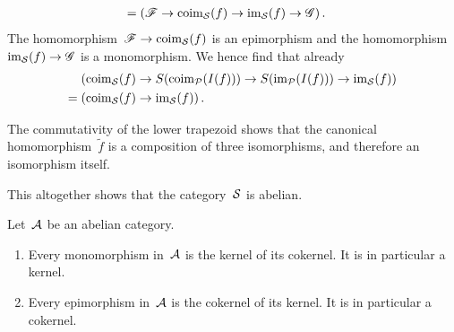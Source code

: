 \begin{example}
\begin{enumerate}[resume]
\begin{itemize}
\begin{align*}
              ={}&  (
                          \mathscr{F}
                      \to \operatorname{coim}_{\mathcal{S}}(f)
                      \to \operatorname{im}_{\mathcal{S}}(f)
                      \to \mathscr{G}
                    ) \,.
          \end{align*}
          The homomorphism~$\mathscr{F} \to \operatorname{coim}_{\mathcal{S}}(f)$ is an epimorphism and the homomorphism~$\operatorname{im}_{\mathcal{S}}(f) \to \mathscr{G}$ is a monomorphism.
          We hence find that already
          \begin{align*}
            {}&
              (
                    \operatorname{coim}_{\mathcal{S}}(f)
                \to S(\operatorname{coim}_{\mathcal{P}}(I(f)))
                \to S(\operatorname{im}_{\mathcal{P}}(I(f)))
                \to \operatorname{im}_{\mathcal{S}}(f)
              )
            \\
            ={}&
              (
                    \operatorname{coim}_{\mathcal{S}}(f)
                \to \operatorname{im}_{\mathcal{S}}(f)
              ) \,.
          \end{align*}
      \end{itemize}
      The commutativity of the lower trapezoid shows that the canonical homomorphism~$\tilde{f}$ is a composition of three isomorphisms, and therefore an isomorphism itself.
  \end{enumerate}
  
  This altogether shows that the category~$\mathcal{S}$ is abelian.
\end{example}


\begin{lemma}
  Let~$\mathcal{A}$ be an abelian category.
  \begin{enumerate}
    \item
      Every monomorphism in~$\mathcal{A}$ is the kernel of its cokernel.
      It is in particular a kernel.
    \item
      Every epimorphism in~$\mathcal{A}$ is the cokernel of its kernel.
      It is in particular a cokernel.
  \end{enumerate}
\end{lemma}


